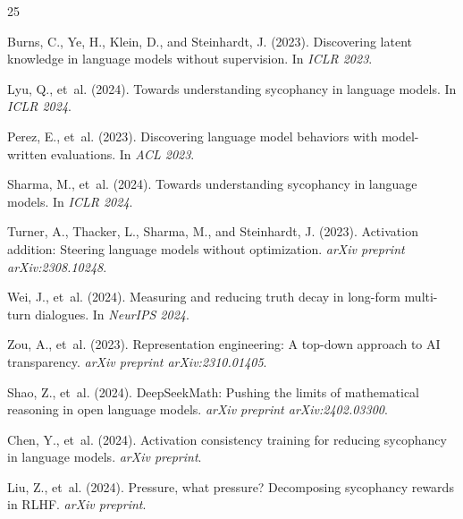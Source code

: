 \documentclass[11pt,a4paper]{article}
\begin{document}

\begin{thebibliography}{25}

Burns, C., Ye, H., Klein, D., and Steinhardt, J. (2023).
\newblock Discovering latent knowledge in language models without supervision.
\newblock In \emph{ICLR 2023}.

Lyu, Q., et~al. (2024).
\newblock Towards understanding sycophancy in language models.
\newblock In \emph{ICLR 2024}.

Perez, E., et~al. (2023).
\newblock Discovering language model behaviors with model-written evaluations.
\newblock In \emph{ACL 2023}.

Sharma, M., et~al. (2024).
\newblock Towards understanding sycophancy in language models.
\newblock In \emph{ICLR 2024}.

Turner, A., Thacker, L., Sharma, M., and Steinhardt, J. (2023).
\newblock Activation addition: Steering language models without optimization.
\newblock \emph{arXiv preprint arXiv:2308.10248}.

Wei, J., et~al. (2024).
\newblock Measuring and reducing truth decay in long-form multi-turn dialogues.
\newblock In \emph{NeurIPS 2024}.

Zou, A., et~al. (2023).
\newblock Representation engineering: A top-down approach to AI transparency.
\newblock \emph{arXiv preprint arXiv:2310.01405}.

Shao, Z., et~al. (2024).
\newblock DeepSeekMath: Pushing the limits of mathematical reasoning in open language models.
\newblock \emph{arXiv preprint arXiv:2402.03300}.

Chen, Y., et~al. (2024).
\newblock Activation consistency training for reducing sycophancy in language models.
\newblock \emph{arXiv preprint}.

Liu, Z., et~al. (2024).
\newblock Pressure, what pressure? Decomposing sycophancy rewards in RLHF.
\newblock \emph{arXiv preprint}.


\end{thebibliography}
\end{document}
